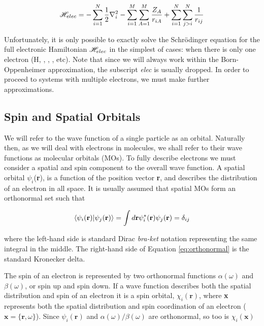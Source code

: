 \begin{equation}
  \mathscr{H}_{elec} = -\sum_{i=1}^N \frac{1}{2}\nabla_i^2  -\sum_{i=1}^M\sum_{A=1}^M\frac{Z_A}{r_{iA}}
  + \sum_{i=1}^N\sum_{j>i}^N \frac{1}{r_{ij}}
\label{eq:hamelect}
\end{equation}

\noindent Unfortunately, it is only possible to exactly solve the Schr{\"o}dinger equation for the full electronic Hamiltonian $\mathscr{H}_{elec}$ in the simplest of cases: when there is only one electron (H, , , , etc). Note that since we will always work within the Born-Oppenheimer approximation, the subscript \emph{elec} is usually dropped.  In order to proceed to systems with multiple electrons, we must make further approximations.

\subsection{Spin and Spatial Orbitals}

We will refer to the wave function of a single particle as an orbital. Naturally then, as we will deal with electrons in molecules, we shall refer to their wave functions as molecular orbitals (MOs). To fully describe electrons we must consider a spatial and spin component to the overall wave function. A spatial orbital $\psi_i$(\textbf{r}), is a function of the position vector \textbf{r}, and describes the distribution of an electron in all space. It is usually assumed that spatial MOs form an orthonormal set such that

\begin{equation}
\bra{\psi_i(\mathbf{r})}\ket{\psi_j(\mathbf{r})} =
\int d\mathbf{r} \psi_i^*(\mathbf{r})\psi_j(\mathbf{r}) = \delta_{ij}
\label{eq:orthonormal}
\end{equation}

\noindent where the left-hand side is standard Dirac \emph{bra-ket} notation representing the same integral in the middle. The right-hand side of Equation \ref{eq:orthonormal} is the standard Kronecker delta.

The spin of an electron is represented by two orthonormal functions $\alpha(\omega)$ and $\beta(\omega)$, or spin up and spin down. If a wave function describes both the spatial distribution and spin of an electron it is a spin orbital, $\chi_i(\mathbf{r})$, where \textbf{x} represents both the spatial distribution and spin coordination of an electron ($\mathbf{x} = \{ \mathbf{r}, \omega \}$). Since $\psi_i(\mathbf{r})$ and $\alpha(\omega)/\beta(\omega)$ are orthonormal, so too is $\chi_i(\mathbf{x})$

